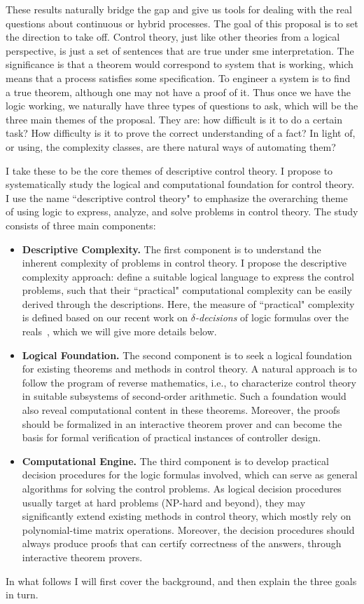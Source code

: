 \documentclass[10pt]{article}
\theoremstyle{definition}
\begin{document}
These results naturally bridge the gap and give us tools for dealing with the real questions about continuous or hybrid processes. The goal of this proposal is to set the direction to take off. 
Control theory, just like other theories from a logical perspective, is just a set of sentences that are true under sme interpretation. The significance is that a theorem would correspond to system that is working, which means that a process satisfies some specification. To engineer a system is to find a true theorem, although one may not have a proof of it. Thus once we have the logic working, we naturally have three types of questions to ask, which will be the three main themes of the proposal. They are: how difficult is it to do a certain task? How difficulty is it to prove the correct understanding of a fact? In light of, or using, the complexity classes, are there natural ways of automating them?

I take these to be the core themes of descriptive control theory. I propose to systematically study the logical and computational foundation for control theory. I use the name ``descriptive control theory" to emphasize the overarching theme of using logic to express, analyze, and solve problems in control theory. The study consists of three main components:
\begin{itemize}
\item {\bf Descriptive Complexity.} The first component is to understand the inherent complexity of problems in control theory. I propose the descriptive complexity approach: define a suitable logical language to express the control problems, such that their ``practical" computational complexity can be easily derived through the descriptions. Here, the measure of ``practical" complexity is defined based on our recent work on {\em $\delta$-decisions} of logic formulas over the reals~\cite{DBLP:conf/lics/GaoAC12,DBLP:conf/cade/GaoAC12}, which we will give more details below. 
\item {\bf Logical Foundation.} The second component is to seek a logical foundation for existing theorems and methods in control theory. A natural approach is to follow the program of reverse mathematics, i.e., to characterize control theory in suitable subsystems of second-order arithmetic. Such a foundation would also reveal computational content in these theorems. Moreover, the proofs should be formalized in an interactive theorem prover and can become the basis for formal verification of practical instances of controller design. 
\item {\bf Computational Engine.} The third component is to develop practical decision procedures for the logic formulas involved, which can serve as general algorithms for solving the control problems. As logical decision procedures usually target at hard problems (NP-hard and beyond), they may significantly extend existing methods in control theory, which mostly rely on polynomial-time matrix operations. Moreover, the decision procedures should always produce proofs that can certify correctness of the answers, through interactive theorem provers. 
\end{itemize}
In what follows I will first cover the background, and then explain the three goals in turn. 
\end{document}
